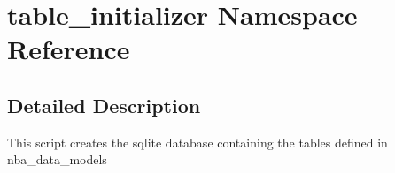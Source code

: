 \hypertarget{namespacetable__initializer}{}\section{table\+\_\+initializer Namespace Reference}
\label{namespacetable__initializer}


\subsection{Detailed Description}
\begin{DoxyVerb}This script creates the sqlite database containing the tables defined in
nba_data_models
\end{DoxyVerb}
 